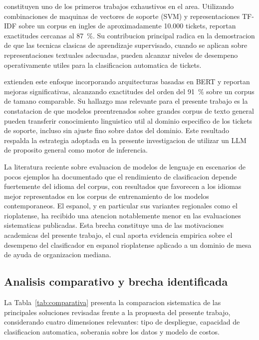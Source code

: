 \textcite{Paramesh2019_it_service_desk} constituyen uno de los primeros trabajos exhaustivos en el area. Utilizando combinaciones de maquinas de vectores de soporte (SVM) y representaciones TF-IDF sobre un corpus en ingles de aproximadamente 10.000 tickets, reportan exactitudes cercanas al 87~\%. Su contribucion principal radica en la demostracion de que las tecnicas clasicas de aprendizaje supervisado, cuando se aplican sobre representaciones textuales adecuadas, pueden alcanzar niveles de desempeno operativamente utiles para la clasificacion automatica de tickets.

\textcite{Revina2020_bert_tickets} extienden este enfoque incorporando arquitecturas basadas en BERT y reportan mejoras significativas, alcanzando exactitudes del orden del 91~\% sobre un corpus de tamano comparable. Su hallazgo mas relevante para el presente trabajo es la constatacion de que modelos preentrenados sobre grandes corpus de texto general pueden transferir conocimiento linguistico util al dominio especifico de los tickets de soporte, incluso sin ajuste fino sobre datos del dominio. Este resultado respalda la estrategia adoptada en la presente investigacion de utilizar un LLM de proposito general como motor de inferencia.

La literatura reciente sobre evaluacion de modelos de lenguaje en escenarios de pocos ejemplos ha documentado que el rendimiento de clasificacion depende fuertemente del idioma del corpus, con resultados que favorecen a los idiomas mejor representados en los corpus de entrenamiento de los modelos contemporaneos. El espanol, y en particular sus variantes regionales como el rioplatense, ha recibido una atencion notablemente menor en las evaluaciones sistematicas publicadas. Esta brecha constituye una de las motivaciones academicas del presente trabajo, el cual aporta evidencia empirica sobre el desempeno del clasificador en espanol rioplatense aplicado a un dominio de mesa de ayuda de organizacion mediana.

\subsection{Analisis comparativo y brecha identificada}

La Tabla~\ref{tab:comparativa} presenta la comparacion sistematica de las principales soluciones revisadas frente a la propuesta del presente trabajo, considerando cuatro dimensiones relevantes: tipo de despliegue, capacidad de clasificacion automatica, soberania sobre los datos y modelo de costos.

